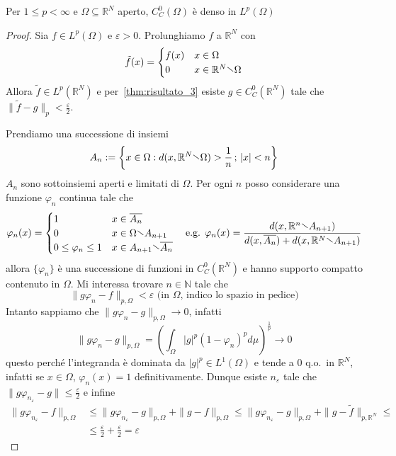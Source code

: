 \begin{theorem}[\(\overline{C_C^0(\Omega)} = L^p(\Omega)\) ]\label{thm:risultato_4}
    Per \(1 \le p < \infty\) e \(\Omega \subseteq \mathbb{R}^{N} \) aperto, 
    \(C_C^{0}{(\Omega)}\) è denso in \(L^p{(\Omega)}\)
\end{theorem}
\begin{proof}
    Sia \(f \in L^p(\Omega)\) e \(\varepsilon>0\). Prolunghiamo \(f\) a
    \(\mathbb{R}^{N}\) con 
    \[
        \tilde{f}{(x)} = \begin{cases}
            f{(x)} & x \in \Omega \\
            0 & x \in \mathbb{R}^{N} \sminus \Omega
        \end{cases}
    \]
    Allora \(\tilde{f} \in L^p(\mathbb{R}^{N})\) e per~\ref{thm:risultato_3}
    esiste \(g \in C_C^{0}{(\mathbb{R}^{N})}\) tale che \(\|\tilde{f} - g\|_p <
    \frac{\varepsilon}{2}\).

    Prendiamo una successione di insiemi 
    \[
        A_{n} := \left\{x \in \Omega: d{(x, \mathbb{R}^{N} \sminus \Omega)} >
        \frac{1}{n} \, ; \, |x| < n\right\} 
    \]
    \(A_{n}\) sono sottoinsiemi aperti e limitati di \(\Omega\). Per ogni \(n\)
    posso considerare una funzione \(\varphi_n\) continua tale che
    \[
        \varphi_n{(x)} = \begin{cases}
            1 & x \in \overline{A_{n}} \\
            0 & x \in \Omega \sminus A_{n+1} \\
            0 \le \varphi_n \le 1 & x \in A_{n+1} \sminus \overline{A_{n}}
        \end{cases}
        \quad \text{e.g. }
        \varphi_n{(x)} = \frac{d(x, \mathbb{R}^{n} \sminus A_{n+1})}{d{(x,
        \overline{A_{n}}) + d{(x, \mathbb{R}^{N} \sminus A_{n+1})}}}
    \]
    allora \(\{\varphi _n\} \) è una successione di funzioni in
    \(C_C^{0}{(\mathbb{R}^{N})}\) e hanno supporto compatto contenuto in
    \(\Omega\). Mi interessa trovare \(n \in \mathbb{N}\) tale che
    \[
        \|g \varphi_n - f\|_{p, \Omega}  < \varepsilon \text{ (in \(\Omega\),
        indico lo spazio in pedice)}
    \]
    Intanto sappiamo che \(\|g \varphi _n - g\|_{p, \Omega} \to 0\), infatti
    \[
        \|g \varphi _n - g \|_{p, \Omega}  = {\left( \int_{\Omega} |g|^{p} {(1 -
    \varphi _n)}^{p} d\mu \right)}^{\frac{1}{p}} \to 0
    \]
    questo perché l'integranda è dominata da \(|g|^{p} \in L^1(\Omega)\)
    e tende a 0 q.o.~in \(\mathbb{R}^{N}\), infatti se \(x \in \Omega\),
    \(\varphi_n{(x)} = 1\) definitivamente. Dunque esiste \(n_\varepsilon\) tale
    che \(\|g \varphi_{n_\varepsilon} - g\| \le \frac{\varepsilon}{2}\) 
    e infine
    \begin{align*}
        \|g \varphi_{n_\varepsilon}  - f\|_{p, \Omega}  &\le   \|g \varphi
        _{n_\varepsilon}  - g\|_{p, \Omega}
        + \|g - f\|_{p, \Omega} \le \|g \varphi_{n_\varepsilon}  - g\|_{p, \Omega} + \|g -
        \tilde{f}\|_{p, \mathbb{R}^{N}} \le \\
        &\le \frac{\varepsilon}{2} + \frac{\varepsilon}{2} = \varepsilon
    \end{align*}
\end{proof}

